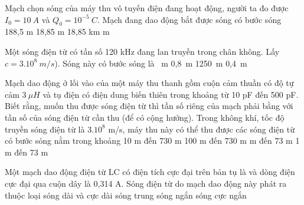 \begin{vidu} %
Mạch chọn sóng của máy thu vô tuyến điện đang hoạt động, người ta đo được $I_0=10\ A$ và $Q_0=10^{-5}\ C$.  Mạch đang dao động bắt được sóng có bước sóng
\choice
{188,5 m}
{18,85 m}
{18,85 km}
{ m}
\end{vidu}
\begin{vidu} %
 Một sóng điện từ có tần số 120 kHz đang lan truyền trong chân không. Lấy $c = 3.10^8\ m/s$). Sóng này có bước sóng là
\choice
{\ m}
{0,8\ m}
{1250\ m}	
{0,4\ m}
\end{vidu}
\begin{vidu} %
 Mạch dao động ở lối vào của một máy thu thanh gồm cuộn cảm thuần có độ tự cảm $3\ \mu H$ và tụ điện có điện dung biến thiên trong khoảng từ 10 pF đến 500 pF. Biết rằng, muốn thu được sóng điện từ thì tần số riêng của mạch phải bằng với tần số của sóng điện từ cần thu (để có cộng hưởng). Trong không khí, tốc độ truyền sóng điện từ là $3.10^8$ m/s, máy thu này có thể thu được các sóng điện từ có bước sóng nằm trong khoảng
\choice
{10 m đến 730 m}
{100 m đến 730 m}
{ m đến 73 m}
{1 m đến 73 m}
\end{vidu}
\begin{vidu} %
Một mạch dao động điện từ LC có điện tích cực đại trên bản tụ là  và dòng điện cực đại qua cuộn dây là 0,314 A. Sóng điện từ  do mạch dao động này phát ra thuộc loại
\choice
{\True sóng dài và cực dài}
{sóng trung}
{sóng ngắn}
{sóng cực ngắn}
\end{vidu}
